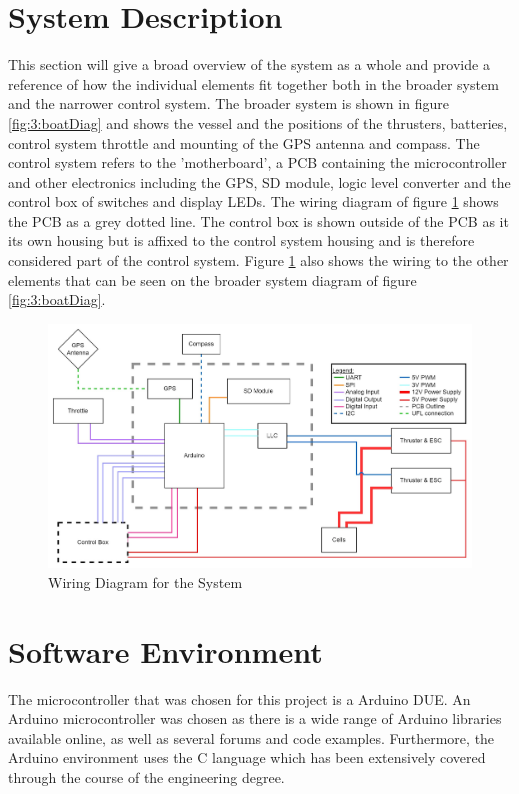 \section{System Description}
This section will give a broad overview of the system as a whole and  provide a reference of how the individual elements fit together both in the broader system and the narrower control system. The broader system is shown in figure \ref{fig:3:boatDiag} and shows the vessel and the positions of the thrusters, batteries, control system throttle and mounting of the GPS antenna and compass. The control system refers to the 'motherboard', a PCB containing the microcontroller and other electronics including the GPS, SD module, logic level converter and the control box of switches and display LEDs. The wiring diagram of figure \ref{fig:3:wiring} shows the PCB as a grey dotted line. The control box is shown outside of the PCB as it its own housing but is affixed to the control system housing and is therefore considered part of the control system. Figure \ref{fig:3:wiring} also shows the wiring to the other elements that can be seen on the broader system diagram of figure \ref{fig:3:boatDiag}. \par
\begin{figure}[ht]
	\begin{center}
		\includegraphics[width =\linewidth]{figures/Wiring diagram.jpg}
		\caption{Wiring Diagram for the System}
		\label{fig:3:wiring}
	\end{center}
\end{figure}

\section{Software Environment}
The microcontroller that was chosen for this project is a Arduino DUE. An Arduino microcontroller was chosen as there is a wide range of Arduino libraries available online, as well as several forums and code examples. Furthermore, the Arduino environment uses the C language which has been extensively covered through the course of the engineering degree. \par
